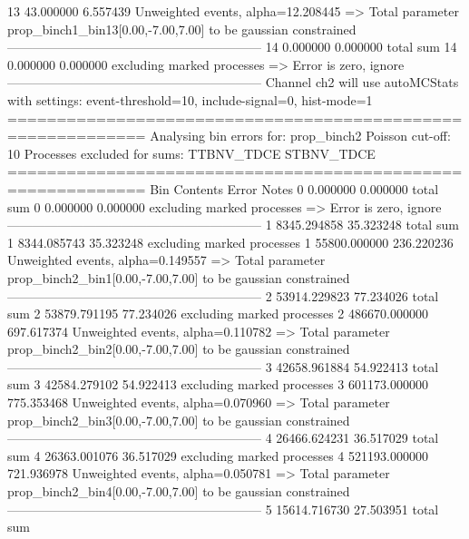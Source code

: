 13         43.000000       6.557439        Unweighted events, alpha=12.208445
  => Total parameter prop_binch1_bin13[0.00,-7.00,7.00] to be gaussian constrained
------------------------------------------------------------
14         0.000000        0.000000        total sum                     
14         0.000000        0.000000        excluding marked processes    
  => Error is zero, ignore      
------------------------------------------------------------
Channel ch2 will use autoMCStats with settings: event-threshold=10, include-signal=0, hist-mode=1
============================================================
Analysing bin errors for: prop_binch2
Poisson cut-off: 10
Processes excluded for sums: TTBNV_TDCE STBNV_TDCE
============================================================
Bin        Contents        Error           Notes                         
0          0.000000        0.000000        total sum                     
0          0.000000        0.000000        excluding marked processes    
  => Error is zero, ignore      
------------------------------------------------------------
1          8345.294858     35.323248       total sum                     
1          8344.085743     35.323248       excluding marked processes    
1          55800.000000    236.220236      Unweighted events, alpha=0.149557
  => Total parameter prop_binch2_bin1[0.00,-7.00,7.00] to be gaussian constrained
------------------------------------------------------------
2          53914.229823    77.234026       total sum                     
2          53879.791195    77.234026       excluding marked processes    
2          486670.000000   697.617374      Unweighted events, alpha=0.110782
  => Total parameter prop_binch2_bin2[0.00,-7.00,7.00] to be gaussian constrained
------------------------------------------------------------
3          42658.961884    54.922413       total sum                     
3          42584.279102    54.922413       excluding marked processes    
3          601173.000000   775.353468      Unweighted events, alpha=0.070960
  => Total parameter prop_binch2_bin3[0.00,-7.00,7.00] to be gaussian constrained
------------------------------------------------------------
4          26466.624231    36.517029       total sum                     
4          26363.001076    36.517029       excluding marked processes    
4          521193.000000   721.936978      Unweighted events, alpha=0.050781
  => Total parameter prop_binch2_bin4[0.00,-7.00,7.00] to be gaussian constrained
------------------------------------------------------------
5          15614.716730    27.503951       total sum                     
